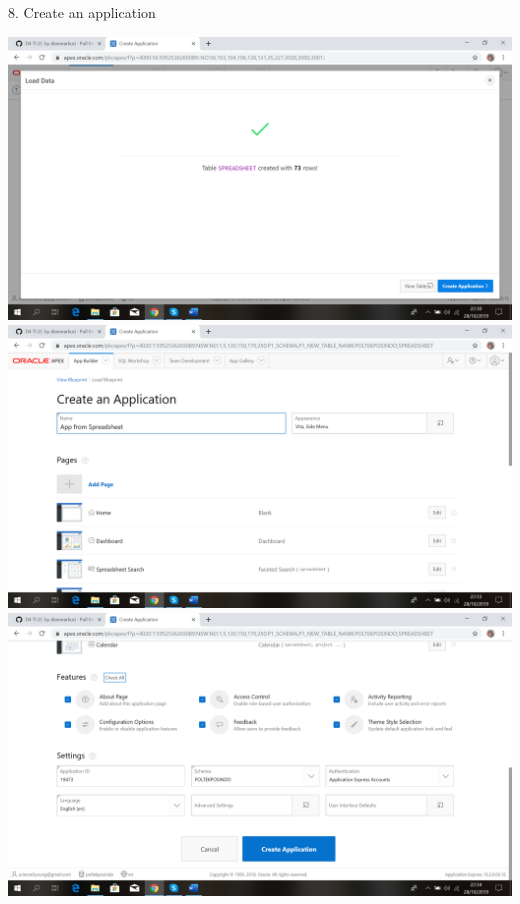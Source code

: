 \documentclass{article}
\begin{document}
\item 8. Create an application
\begin{center}
  \includegraphics[width=10cm\textwidth]{gambar/10.png}
  \includegraphics[width=10cm\textwidth]{gambar/11.png}
  \includegraphics[width=10cm\textwidth]{gambar/12.png}
\end{center}
\end{document}
